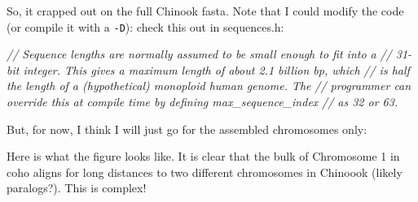 \documentclass[]{krantz}
\makeatletter
\newenvironment{Shaded}{\begin{snugshade}}{\end{snugshade}}
\newcommand{\BuiltInTok}[1]{#1}
\newcommand{\CommentTok}[1]{\textcolor[rgb]{0.37,0.37,0.37}{\textit{#1}}}
\newcommand{\ExtensionTok}[1]{#1}
\newcommand{\FunctionTok}[1]{\textcolor[rgb]{0,0,0}{#1}}
\newcommand{\NormalTok}[1]{#1}
\newcommand{\OperatorTok}[1]{\textcolor[rgb]{0.43,0.43,0.43}{\textbf{#1}}}
\newcommand{\StringTok}[1]{\textcolor[rgb]{0.5,0.5,0.5}{#1}}
\newcommand{\VariableTok}[1]{\textcolor[rgb]{0,0,0}{#1}}
\newenvironment{kframe}{%
\medskip{}
\setlength{\fboxsep}{.8em}
 \def\at@end@of@kframe{}%
 \ifinner\ifhmode%
  \def\at@end@of@kframe{\end{minipage}}%
  \begin{minipage}{\columnwidth}%
 \fi\fi%
 \def\FrameCommand##1{\hskip\@totalleftmargin \hskip-\fboxsep
 \colorbox{shadecolor}{##1}\hskip-\fboxsep
     \hskip-\linewidth \hskip-\@totalleftmargin \hskip\columnwidth}%
 \MakeFramed {\advance\hsize-\width
   \@totalleftmargin\z@ \linewidth\hsize
   \@setminipage}}%
 {\par\unskip\endMakeFramed%
 \at@end@of@kframe}
\renewenvironment{Shaded}{\begin{kframe}}{\end{kframe}}
\makeatother
\begin{document}
So, it crapped out on the full Chinook fasta. Note that I could modify the code (or compile it with a \texttt{-D}): check this out in sequences.h:

\begin{Shaded}
\begin{Highlighting}[]
\CommentTok{//  Sequence lengths are normally assumed to be small enough to fit into a}
\CommentTok{//  31-bit integer.  This gives a maximum length of about 2.1 billion bp, which}
\CommentTok{//  is half the length of a (hypothetical) monoploid human genome.  The}
\CommentTok{//  programmer can override this at compile time by defining max_sequence_index}
\CommentTok{//  as 32 or 63.}
\end{Highlighting}
\end{Shaded}

But, for now, I think I will just go for the assembled chromosomes only:

\begin{Shaded}
\end{Shaded}

Here is what the figure looks like. It is clear that the bulk of Chromosome 1
in coho aligns for long distances to two different chromosomes in Chinoook (likely
paralogs?). This is complex!
\end{document}
